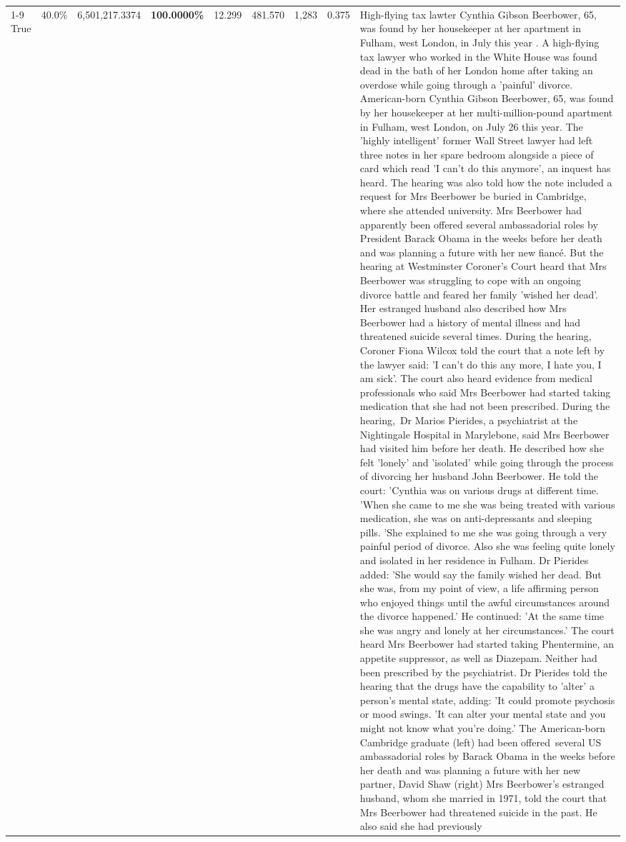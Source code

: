 \begin{table}[H]
\begin{tabular}{lllrlllll}
\cline{1-9}
True & 40.0\% & 6,501,217.3374 & \bfseries \color{red} 100.0000\% & 12.299 & 481.570 & 1,283 & 0.375 & High-flying tax lawter Cynthia Gibson Beerbower, 65, was found by her housekeeper at her apartment in Fulham, west London, in July this year . A high-flying tax lawyer who worked in the White House was found dead in the bath of her London home after taking an overdose while going through a 'painful' divorce. American-born Cynthia Gibson Beerbower, 65, was found by her housekeeper at her multi-million-pound apartment in Fulham, west London, on July 26 this year. The 'highly intelligent' former Wall Street lawyer had left three notes in her spare bedroom alongside a piece of card which read 'I can't do this anymore', an inquest has heard. The hearing was also told how the note included a request for Mrs Beerbower be buried in Cambridge, where she attended university. Mrs Beerbower had apparently been offered several ambassadorial roles by President Barack Obama in the weeks before her death and was planning a future with her new fiancé. But the hearing at Westminster Coroner's Court heard that Mrs Beerbower was struggling to cope with an ongoing divorce battle and feared her family 'wished her dead'. Her estranged husband also described how Mrs Beerbower had a history of mental illness and had threatened suicide several times. During the hearing, Coroner Fiona Wilcox told the court that a note left by the lawyer said: 'I can't do this any more, I hate you, I am sick'. The court also heard evidence from medical professionals who said Mrs Beerbower had started taking medication that she had not been prescribed. During the hearing, Dr Marios Pierides, a psychiatrist at the Nightingale Hospital in Marylebone, said Mrs Beerbower had visited him before her death. He described how she felt 'lonely' and 'isolated' while going through the process of divorcing her husband John Beerbower. He told the court: 'Cynthia was on various drugs at different time. 'When she came to me she was being treated with various medication, she was on anti-depressants and sleeping pills. 'She explained to me she was going through a very painful period of divorce. Also she was feeling quite lonely and isolated in her residence in Fulham. Dr Pierides added: 'She would say the family wished her dead. But she was, from my point of view, a life affirming person who enjoyed things until the awful circumstances around the divorce happened.' He continued: 'At the same time she was angry and lonely at her circumstances.' The court heard Mrs Beerbower had started taking Phentermine, an appetite suppressor, as well as Diazepam. Neither had been prescribed by the psychiatrist. Dr Pierides told the hearing that the drugs have the capability to 'alter' a person's mental state, adding: 'It could promote psychosis or mood swings. 'It can alter your mental state and you might not know what you're doing.' The American-born Cambridge graduate (left) had been offered several US ambassadorial roles by Barack Obama in the weeks before her death and was planning a future with her new partner, David Shaw (right) Mrs Beerbower's estranged husband, whom she married in 1971, told the court that Mrs Beerbower had threatened suicide in the past. He also said she had previously 
\end{tabular}
\end{table}
